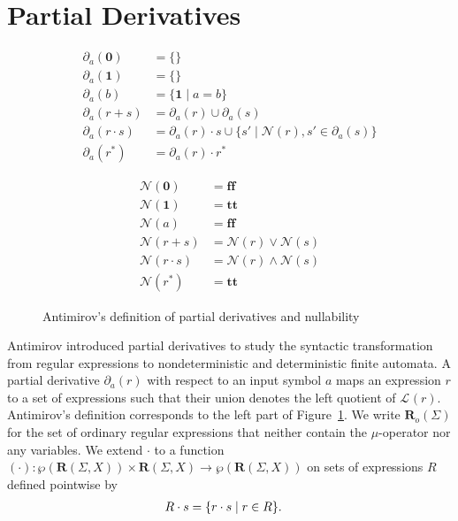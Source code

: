 \documentclass[runningheads, envcountsame, a4paper]{llncs}
\newcommand{\True}{\ensuremath{\mathbf{tt}}}%
\newcommand{\False}{\ensuremath{\mathbf{ff}}}%
\newcommand\Power{\wp}
\newcommand\pderiv[3][{}]{\partial^{#1}_{#3}(#2)}
\newcommand\Rnull{\mathbf0}
\newcommand\Rempty{\mathbf1}
\newcommand\Lang[1][{}]{\mathcal{L}^{#1}}
\newcommand\Reg{\mathbf{R}}
\newcommand\Null{\mathcal{N}}
\begin{document}
\section{Partial Derivatives}
\label{sec:partial-derivatives}

\begin{figure}[t]
  \begin{minipage}[t]{0.6\linewidth}
  \begin{align*}
    \pderiv{\Rnull}{a} &= \{\} \\
    \pderiv{\Rempty}{a} &= \{\} \\
    \pderiv{b}{a} &= \{ \Rempty \mid a=b \}    \\
    \pderiv{r + s}{a} &= \pderiv{r}{a} \cup \pderiv{s}{a} \\
    \pderiv{r \cdot s}{a} &= \pderiv{r}{a} \cdot s \cup \{ s' \mid \Null
                            (r), s' \in \pderiv{s}{a} \} \\
    \pderiv{r^*}{a} &= \pderiv{r}{a} \cdot r^*
  \end{align*}
  \end{minipage}
  \begin{minipage}[t]{0.4\linewidth}
  \begin{align*}
    \Null (\Rnull) &= \False \\
    \Null (\Rempty) &= \True \\
    \Null (a) &= \False \\
    \Null (r + s) &= \Null (r) \vee \Null (s) \\
    \Null (r \cdot s) &= \Null (r) \wedge \Null (s) \\
    \Null (r^*) &= \True 
  \end{align*}
  \end{minipage}
    \color{black}
  \caption{Antimirov's definition of partial derivatives and nullability}
  \label{fig:partial-derivatives}
\end{figure}

Antimirov \cite{Antimirov96Partial} introduced partial derivatives to
study the syntactic transformation from regular expressions to
nondeterministic and deterministic finite automata. A partial
derivative $\pderiv{r}{a}$ with respect to an input symbol $a$ maps an
expression $r$ to a set of expressions such that their union denotes
the left quotient of $\Lang (r)$. Antimirov's definition corresponds
to the left part of Figure~\ref{fig:partial-derivatives}. We write $\Reg_o (\Sigma)$ for
the set of ordinary regular expressions that neither contain the
$\mu$-operator nor any variables.
We extend $\cdot$ to a function $(\cdot) : \Power (\Reg (\Sigma,X))
\times \Reg (\Sigma,X) \to \Power (\Reg (\Sigma,X))$ on sets of
expressions $R$ defined pointwise by
\begin{align*}
  R \cdot s &= \{ r \cdot s \mid r \in R \}
              \text.
\end{align*}
\end{document}
